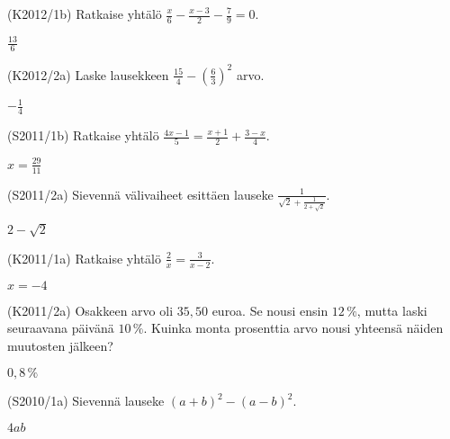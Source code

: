 \begin{tehtava}(K2012/1b) Ratkaise yhtälö $\frac{x}{6} - \frac{x-3}{2} - \frac{7}{9} = 0$. 
                        \begin{vastaus}
				$\frac{13}{6}$
			\end{vastaus}
\end{tehtava}

\begin{tehtava}(K2012/2a) Laske lausekkeen $ \frac{15}{4} - \left( \frac{6}{3} \right)^2 $ arvo.
\begin{vastaus}
				$-\frac{1}{4}$
				\end{vastaus}
\end{tehtava}

\begin{tehtava}(S2011/1b) Ratkaise yhtälö $\frac{4x - 1}{5} = \frac{x + 1}{2} + \frac{3 - x}{4}$.
                        \begin{vastaus}
				$x=\frac{29}{11}$
				\end{vastaus}
\end{tehtava}

\begin{tehtava}(S2011/2a) Sievennä välivaiheet esittäen lauseke $\frac{1}{\sqrt{2} + \frac{1}{2 + \sqrt{2}}}$.
                     \begin{vastaus}
				$2-\sqrt{2}$
				\end{vastaus}
\end{tehtava}


\begin{tehtava}(K2011/1a) Ratkaise yhtälö $\frac{2}{x} = \frac{3}{x - 2}$.
\begin{vastaus}
				$x=-4$
				\end{vastaus}
\end{tehtava}

\begin{tehtava}(K2011/2a) Osakkeen arvo oli $35,50$ euroa. Se nousi ensin $12\,\%$, mutta laski seuraavana päivänä $10\,\%$. Kuinka monta prosenttia arvo nousi yhteensä näiden muutosten jälkeen?
  \begin{vastaus} $0,8\,\%$
  \end{vastaus}
\end{tehtava}


\begin{tehtava}(S2010/1a) Sievennä lauseke $(a + b)^2 - (a - b)^2$.
\begin{vastaus}
				$4ab$
				\end{vastaus}
\end{tehtava}

